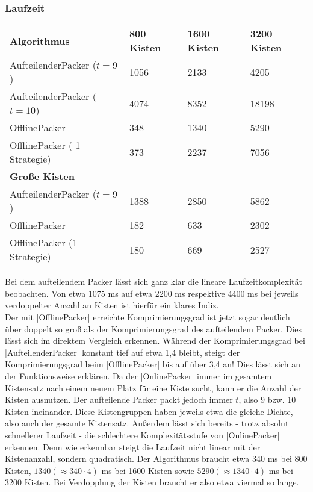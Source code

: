 \subsubsection*{Laufzeit}
\begin{tabular}{llll}
\textbf{Algorithmus} 	& \textbf{800 Kisten} 	& \textbf{1600 Kisten} 	& \textbf{3200 Kisten} 	\\
 AufteilenderPacker ($t=9$)	& 1056		& 2133			& 4205			\\
 AufteilenderPacker ($t=10$)  	& 4074		& 8352			& 18198			\\
 OfflinePacker			& 348		& 1340			& 5290			\\
 OfflinePacker ( 1 Strategie)	& 373		& 2237			& 7056		\vspace*{.48em} \\
\textbf{Große Kisten} & & & \\
 AufteilenderPacker ($t=9$)  	& 1388		& 2850			& 5862			\\
 OfflinePacker			& 182		& 633			& 2302			\\
 OfflinePacker (1 Strategie)	& 180		& 669			& 2527			\\
\end{tabular}

 Bei dem aufteilendem Packer lässt sich ganz klar die lineare Laufzeitkomplexität beobachten.
 Von etwa 1075 ms auf etwa 2200 ms respektive 4400 ms bei jeweils verdoppelter Anzahl an Kisten ist hierfür ein klares Indiz. \\
 Der mit |OfflinePacker| erreichte Komprimierungsgrad ist jetzt sogar deutlich über doppelt so groß als der Komprimierungsgrad des aufteilendem Packer.
 Dies lässt sich im direktem Vergleich erkennen.
 Während der Komprimierungsgrad bei |AufteilenderPacker| konstant tief auf etwa 1,4 bleibt,
  steigt der Komprimierungsgrad beim |OfflinePacker| bis auf über 3,4 an!
 Dies lässt sich an der Funktionsweise erklären.
 Da der |OnlinePacker| immer im gesamtem Kistensatz nach einem neuem Platz für eine Kiste sucht, kann er die Anzahl der Kisten ausnutzen.
 Der aufteilende Packer packt jedoch immer $t$, also 9 bzw. 10 Kisten ineinander.
 Diese Kistengruppen haben jeweils etwa die gleiche Dichte, also auch der gesamte Kistensatz.
 Außerdem lässt sich bereits - trotz absolut schnellerer Laufzeit - die schlechtere Komplexitätsstufe von |OnlinePacker| erkennen.
 Denn wie erkennbar steigt die Laufzeit nicht linear mit der Kistenanzahl, sondern quadratisch.
 Der Algorithmus braucht etwa 340 ms bei 800 Kisten, $1340 (\approx 340 \cdot 4)$ ms bei 1600 Kisten sowie $5290 (\approx 1340 \cdot 4)$ ms bei 3200 Kisten.
 Bei Verdopplung der Kisten braucht er also etwa viermal so lange.

